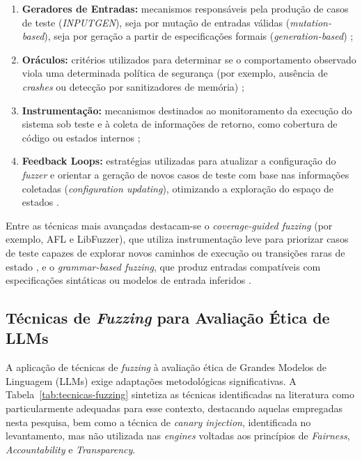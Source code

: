 \begin{enumerate}
    \item \textbf{Geradores de Entradas:} mecanismos responsáveis pela produção de casos de teste (\textit{INPUTGEN}), seja por mutação de entradas válidas (\textit{mutation-based}), seja por geração a partir de especificações formais (\textit{generation-based}) \cite{Manes2021};
    
    \item \textbf{Oráculos:} critérios utilizados para determinar se o comportamento observado viola uma determinada política de segurança (por exemplo, ausência de \textit{crashes} ou detecção por sanitizadores de memória) \cite{Manes2021, Sutton2007};
    
    \item \textbf{Instrumentação:} mecanismos destinados ao monitoramento da execução do sistema sob teste e à coleta de informações de retorno, como cobertura de código ou estados internos \cite{Manes2021};
    
    \item \textbf{Feedback Loops:} estratégias utilizadas para atualizar a configuração do \textit{fuzzer} e orientar a geração de novos casos de teste com base nas informações coletadas (\textit{configuration updating}), otimizando a exploração do espaço de estados \cite{Manes2021, Bohme2016}.
\end{enumerate}

Entre as técnicas mais avançadas destacam-se o \textit{coverage-guided fuzzing} (por exemplo, AFL e LibFuzzer), que utiliza instrumentação leve para priorizar casos de teste capazes de explorar novos caminhos de execução ou transições raras de estado \cite{Bohme2016, Manes2021}, e o \textit{grammar-based fuzzing}, que produz entradas compatíveis com especificações sintáticas ou modelos de entrada inferidos \cite{Manes2021, Godefroid2008}.

\subsection{Técnicas de \textit{Fuzzing} para Avaliação Ética de LLMs}
\label{sec:tecnicas-fuzzing}

A aplicação de técnicas de \textit{fuzzing} à avaliação ética de Grandes Modelos de Linguagem (LLMs) exige adaptações metodológicas significativas. A Tabela~\ref{tab:tecnicas-fuzzing} sintetiza as técnicas identificadas na literatura como particularmente adequadas para esse contexto, destacando aquelas empregadas nesta pesquisa, bem como a técnica de \textit{canary injection}, identificada no levantamento, mas não utilizada nas \textit{engines} voltadas aos princípios de \textit{Fairness}, \textit{Accountability} e \textit{Transparency}.

